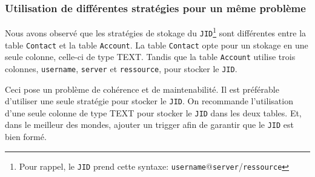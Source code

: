 \documentclass[a4paper,11pt]{article}
\begin{document}
\subsubsection*{Utilisation de différentes stratégies pour un même problème}

Nous avons observé que les stratégies de stokage du \texttt{JID}\footnote{Pour rappel, le \texttt{JID} prend cette syntaxe: \texttt{username}@\texttt{server}/\texttt{ressource}} sont différentes entre la table \texttt{Contact} et la table \texttt{Account}. La table \texttt{Contact} opte pour un stokage en une seule colonne, celle-ci de type TEXT. Tandis que la table \texttt{Account} utilise trois colonnes, \texttt{username}, \texttt{server} et \texttt{ressource}, pour stocker le \texttt{JID}.

Ceci pose un problème de cohérence et de maintenabilité. Il est préférable d'utiliser une seule stratégie pour stocker le \texttt{JID}. On recommande l'utilisation d'une seule colonne de type TEXT pour stocker le \texttt{JID} dans les deux tables. Et, dans le meilleur des mondes, ajouter un trigger afin de garantir que le \texttt{JID} est bien formé.
\end{document}

